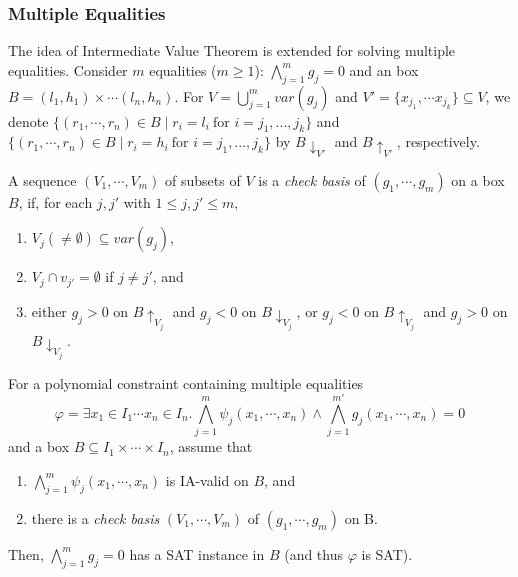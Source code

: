\documentclass[runningheads,a4paper,oribibl]{llncs}
\newcommand{\suppress}[1]{} %
\begin{document}
\subsubsection{Multiple Equalities}
The idea of Intermediate Value Theorem is extended for solving multiple equalities. 
Consider $m$ equalities ($m \ge 1$): $\bigwedge \limits_{j=1}^m g_j = 0$ and 
an box $B = {(l_1, h_1) \times \cdots (l_n, h_n)}$.
For $V = \bigcup \limits_{j=1}^m var(g_j)$ and $V' = \{x_{j_1}, \cdots x_{j_k} \} \subseteq V$,
we denote $\{ (r_1, \cdots, r_n) \in B \mid r_i = l_i~\text{for }i=j_1,...,j_k \}$
and ${\{ (r_1, \cdots, r_n) \in B \mid r_i = h_i~\text{for }i=j_1,...,j_k \}}$
by $B\downarrow_{V'}$ and $B\uparrow_{V'}$, respectively. 

\begin{definition} \label{def:CheckBasis} 
A sequence $(V_1, \cdots, V_m)$ of subsets of $V$ is a {\em check basis} of $(g_1, \cdots, g_m)$ on a box $B$,
if, for each $j,j'$ with $1 \leq j, j' \leq m$, 
\begin{enumerate}
\item $V_j (\neq \emptyset) \subseteq var(g_j)$, 
\item $V_j \cap v_{j'} = \emptyset$ if $j \neq j'$, and 
\item either $g_j > 0$ on $B\uparrow_{V_j}$ and $g_j < 0$ on $B\downarrow_{V_j}$, or
      $g_j < 0$ on $B\uparrow_{V_j}$ and $g_j > 0$ on $B\downarrow_{V_j}$. 
\end{enumerate}
\end{definition} 
\suppress{
For all $j\in \{1, \cdots, m\}$, let $k_j = |V_j|$ and
${V_j = \{v_{jk} \mid 1 \le k \le k_j \}}$, then, there exist two combinations
${(x_{j1}, \cdots, x_{jk_j}) = (t_{j1}, \cdots, t_{jk_j})}$ and
${(x_{j1}, \cdots, x_{jk_j}) = (t'_{j1}, \cdots, t'_{jk_j})}$
where $t_{jk} \neq t'_{jk} \in (l_{jk}, h_{jk})$, $1 \le k \le k_j$ such that
\[g_j(t_{j1}, \cdots, t_{jk_j}, \cdots, x_{jk}, \cdots) > 0\] and
\[g_j(t'_{j1}, \cdots, t'_{jk_j}, \cdots, x_{jk}, \cdots) < 0\]
for all values of $x_{jk}$ in $(l_{jk}, h_{jk})$ where $x_{jk} \in var(g_j) \setminus V_j$.
We denote $ivt(g_j, V_j, I)$ to represent that the polynomial $g_j$ enjoy this property
with respect to $V_j$ and $I$.
} %

\begin{lemma} \label{lem:multieq}
For a polynomial constraint containing multiple equalities \[\varphi= \exists x_1 \in I_1 \cdots x_n \in I_n.
\bigwedge \limits_{j=1}^m \psi_j(x_1,\cdots,x_n) \wedge
\bigwedge \limits_{j=1}^{m'} g_j(x_1,\cdots,x_n) = 0\]
and a box $B \subseteq I_1 \times \cdots \times I_n$, 
assume that
\begin{enumerate}
\item $\bigwedge \limits_{j=1}^m \psi_j(x_1,\cdots,x_n)$ is IA-valid on $B$, and
\item there is a {\em check basis} $(V_1, \cdots, V_m)$ of $(g_1, \cdots, g_m)$ on B. 
\end{enumerate}
Then, $\bigwedge \limits_{j=1}^m g_j = 0$ has a SAT instance in $B$
(and thus $\varphi$ is SAT). 
\end{lemma}
\end{document}
